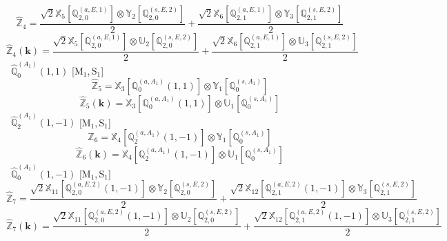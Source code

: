 \documentclass[fleqn,10pt,landscape]{article}
\begin{document}
\begin{itemize}
\begin{dmath*}
\hat{\mathbb{Z}}_{4}=\frac{\sqrt{2} \mathbb{X}_{5}[\mathbb{Q}_{2,0}^{(a,E,1)}] \otimes\mathbb{Y}_{2}[\mathbb{Q}_{2,0}^{(s,E,2)}]}{2} + \frac{\sqrt{2} \mathbb{X}_{6}[\mathbb{Q}_{2,1}^{(a,E,1)}] \otimes\mathbb{Y}_{3}[\mathbb{Q}_{2,1}^{(s,E,2)}]}{2}
\end{dmath*}
\begin{dmath*}
\hat{\mathbb{Z}}_{4}(\bm{k})=\frac{\sqrt{2} \mathbb{X}_{5}[\mathbb{Q}_{2,0}^{(a,E,1)}] \otimes\mathbb{U}_{2}[\mathbb{Q}_{2,0}^{(s,E,2)}]}{2} + \frac{\sqrt{2} \mathbb{X}_{6}[\mathbb{Q}_{2,1}^{(a,E,1)}] \otimes\mathbb{U}_{3}[\mathbb{Q}_{2,1}^{(s,E,2)}]}{2}
\end{dmath*}
\vspace{4mm}
\noindent {} $\,\,\,\hat{\mathbb{Q}}_{0}^{(A_{1})}(1,1)$ [M$_{1}$,\,S$_{1}$]
\begin{dmath*}
\hat{\mathbb{Z}}_{5}=\mathbb{X}_{3}[\mathbb{Q}_{0}^{(a,A_{1})}(1,1)] \otimes\mathbb{Y}_{1}[\mathbb{Q}_{0}^{(s,A_{1})}]
\end{dmath*}
\begin{dmath*}
\hat{\mathbb{Z}}_{5}(\bm{k})=\mathbb{X}_{3}[\mathbb{Q}_{0}^{(a,A_{1})}(1,1)] \otimes\mathbb{U}_{1}[\mathbb{Q}_{0}^{(s,A_{1})}]
\end{dmath*}
\vspace{4mm}
\noindent {} $\,\,\,\hat{\mathbb{Q}}_{2}^{(A_{1})}(1,-1)$ [M$_{1}$,\,S$_{1}$]
\begin{dmath*}
\hat{\mathbb{Z}}_{6}=\mathbb{X}_{4}[\mathbb{Q}_{2}^{(a,A_{1})}(1,-1)] \otimes\mathbb{Y}_{1}[\mathbb{Q}_{0}^{(s,A_{1})}]
\end{dmath*}
\begin{dmath*}
\hat{\mathbb{Z}}_{6}(\bm{k})=\mathbb{X}_{4}[\mathbb{Q}_{2}^{(a,A_{1})}(1,-1)] \otimes\mathbb{U}_{1}[\mathbb{Q}_{0}^{(s,A_{1})}]
\end{dmath*}
\vspace{4mm}
\noindent {} $\,\,\,\hat{\mathbb{Q}}_{0}^{(A_{1})}(1,-1)$ [M$_{1}$,\,S$_{1}$]
\begin{dmath*}
\hat{\mathbb{Z}}_{7}=\frac{\sqrt{2} \mathbb{X}_{11}[\mathbb{Q}_{2,0}^{(a,E,2)}(1,-1)] \otimes\mathbb{Y}_{2}[\mathbb{Q}_{2,0}^{(s,E,2)}]}{2} + \frac{\sqrt{2} \mathbb{X}_{12}[\mathbb{Q}_{2,1}^{(a,E,2)}(1,-1)] \otimes\mathbb{Y}_{3}[\mathbb{Q}_{2,1}^{(s,E,2)}]}{2}
\end{dmath*}
\begin{dmath*}
\hat{\mathbb{Z}}_{7}(\bm{k})=\frac{\sqrt{2} \mathbb{X}_{11}[\mathbb{Q}_{2,0}^{(a,E,2)}(1,-1)] \otimes\mathbb{U}_{2}[\mathbb{Q}_{2,0}^{(s,E,2)}]}{2} + \frac{\sqrt{2} \mathbb{X}_{12}[\mathbb{Q}_{2,1}^{(a,E,2)}(1,-1)] \otimes\mathbb{U}_{3}[\mathbb{Q}_{2,1}^{(s,E,2)}]}{2}

\end{dmath*}
\end{itemize}
\end{document}
